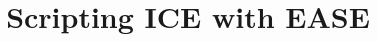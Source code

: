 \documentclass{report}
\begin{document}
\title{Scripting ICE with EASE}
\maketitle{}


\end{document}
